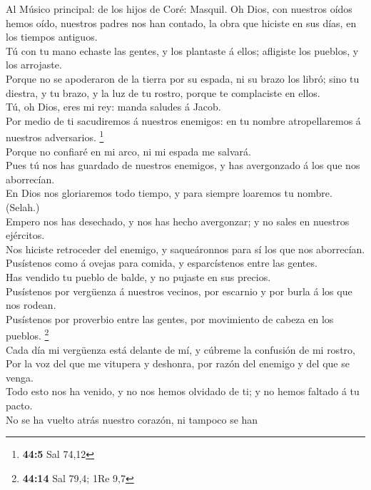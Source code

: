  Al Músico principal: de los hijos de Coré: Masquil. Oh
Dios, con nuestros oídos hemos oído, nuestros padres nos han contado, la
obra que hiciste en sus días, en los tiempos antiguos.\\
 Tú con tu mano echaste las gentes, y los plantaste á ellos;
afligiste los pueblos, y los arrojaste.\\
 Porque no se apoderaron de la tierra por su espada, ni su
brazo los libró; sino tu diestra, y tu brazo, y la luz de tu rostro,
porque te complaciste en ellos.\\
 Tú, oh Dios, eres mi rey: manda saludes á Jacob.\\
 Por medio de ti sacudiremos á nuestros enemigos: en tu
nombre atropellaremos á nuestros adversarios. \footnote{\textbf{44:5}
  Sal 74,12}\\
 Porque no confiaré en mi arco, ni mi espada me salvará.\\
 Pues tú nos has guardado de nuestros enemigos, y has
avergonzado á los que nos aborrecían.\\
 En Dios nos gloriaremos todo tiempo, y para siempre
loaremos tu nombre. (Selah.)\\
 Empero nos has desechado, y nos has hecho avergonzar; y no
sales en nuestros ejércitos.\\
 Nos hiciste retroceder del enemigo, y saqueáronnos para sí
los que nos aborrecían.\\
 Pusístenos como á ovejas para comida, y esparcístenos
entre las gentes.\\
 Has vendido tu pueblo de balde, y no pujaste en sus
precios.\\
 Pusístenos por vergüenza á nuestros vecinos, por escarnio
y por burla á los que nos rodean.\\
 Pusístenos por proverbio entre las gentes, por movimiento
de cabeza en los pueblos. \footnote{\textbf{44:14} Sal 79,4; 1Re 9,7}\\
 Cada día mi vergüenza está delante de mí, y cúbreme la
confusión de mi rostro,\\
 Por la voz del que me vitupera y deshonra, por razón del
enemigo y del que se venga.\\
 Todo esto nos ha venido, y no nos hemos olvidado de ti; y
no hemos faltado á tu pacto.\\
 No se ha vuelto atrás nuestro corazón, ni tampoco se han
